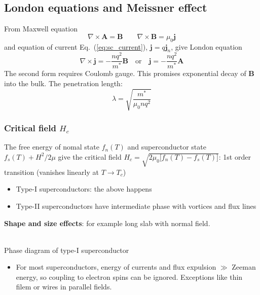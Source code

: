 \documentclass[11pt,letterpaper]{article}
\numberwithin{equation}{section} %
\renewcommand*{\vec}[1]{\bm{#1}}
\begin{document}
\subsection{London equations and Meissner effect}
\label{sub:Meissner effect}
From Maxwell equation 
\begin{equation}
  \nabla\times\vec A = \vec B \qquad \nabla\times\vec B = \mu_0\vec j
\end{equation}
and equation of current Eq.~(\ref{eq:sc_current}), $\vec j = q\vec j_n$,
give London equation
\begin{equation}
	\nabla\times\vec j = -\frac{n q^2}{m^*}\vec B
	\mbox{~~~or~~~}
	\vec j = -\frac{nq^2}{m^*}\vec A
\end{equation}
The second form requires Coulomb gauge. This promises exponential decay of
$\vec B$ into the bulk. The penetration length: 
\begin{equation}\label{eq:penetration_length}
	\lambda = \sqrt{\frac{m^*}{\mu_0 n q^2}}
\end{equation}

\subsubsection[Critical field Hc]{Critical field $H_c$}
\label{ssub:critical_field}
The free energy of nomal state $f_n(T)$ and superconductor state $f_s(T) +
H^2/2\mu$ give the critical field $H_c =
\sqrt{2\mu_0\big[f_n(T)-f_s(T)\big]}$: 1st order transition (vanishes
linearly at $T\to T_c$)
\begin{itemize}
  \item Type-I superconductors: the above happens
  \item Type-II superconductors have intermediate phase with vortices and
	  flux lines
\end{itemize}

\textbf{Shape and size effects}: for example long slab with normal field. 
\begin{center}
\\
Phase diagram of type-I superconductor
\end{center}
\begin{itemize}
  \item For most superconductors, energy of currents and flux expulsion $\gg$
	  Zeeman energy, so coupling to electron spins can be ignored. Exceptions
	  like thin filem or wires in parallel fields. 
\end{itemize}
\end{document}
